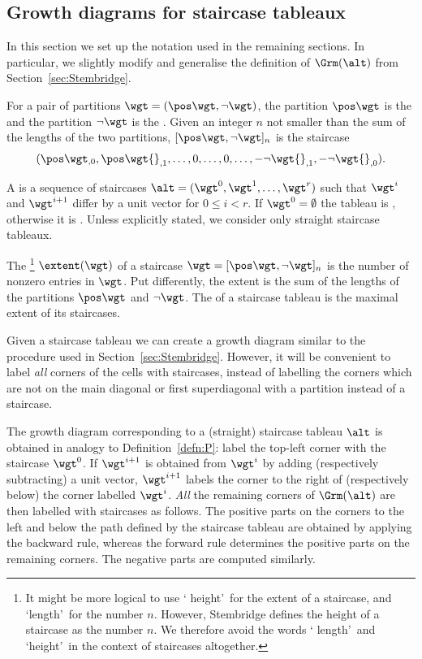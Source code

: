 \subsection{Growth diagrams for staircase tableaux}

In this section we set up the notation used in the remaining
sections. In particular, we slightly modify and generalise the
definition of $\Grm(\alt)$ from Section~\ref{sec:Stembridge}.
\begin{defi}
 For a pair of partitions $\wgt=(\pos\wgt,\neg\wgt)$, the partition
 $\pos\wgt$ is the  and the partition $\neg\wgt$
 is the . Given an integer $n$ not smaller than
 the sum of the lengths of the two partitions,
 $[\pos\wgt,\neg\wgt]_n$ is the staircase
 \[
 ({\pos\wgt}{}_{,0},\pos\wgt{}_{,1},\dots,0,\dots,0,
 \dots,-\neg\wgt{}_{,1},-\neg\wgt{}_{,0}).
 \]

 A  is a sequence of staircases
 $\alt=(\wgt^0,\wgt^1,\dots,\wgt^r)$ such that $\wgt^i$ and
 $\wgt^{i+1}$ differ by a unit vector for $0\leq i<r$. If
 $\wgt^0=\emptyset$ the tableau is , otherwise it is
 . Unless explicitly stated, we consider only straight
 staircase tableaux.

 The \footnote{It might be more logical to use \lq
 height\rq\ for the extent of a staircase, and \lq length\rq\ for
 the number $n$. However, Stembridge defines the height of a
 staircase as the number $n$. We therefore avoid the words \lq
 length\rq\ and \lq height\rq\ in the context of staircases
 altogether.} $\extent(\wgt)$ of a staircase
 $\wgt=[\pos\wgt,\neg\wgt]_n$ is the number of nonzero entries in
 $\wgt$. Put differently, the extent is the sum of the lengths of
 the partitions $\pos\wgt$ and $\neg\wgt$. The  of a
 staircase tableau is the maximal extent of its staircases.
\end{defi}

Given a staircase tableau we can create a growth diagram similar to
the procedure used in Section~\ref{sec:Stembridge}. However, it will
be convenient to label \emph{all} corners of the cells with
staircases, instead of labelling the corners which are not on the
main diagonal or first superdiagonal with a partition instead of a
staircase.
\begin{defi}
 The growth diagram \Dfn{$\Grm(\alt)$} corresponding to a (straight)
 staircase tableau $\alt$ is obtained in analogy to
 Definition~\ref{defn:P}: label the top-left corner with the
 staircase $\wgt^0$. If $\wgt^{i+1}$ is obtained from $\wgt^i$ by
 adding (respectively subtracting) a unit vector, $\wgt^{i+1}$
 labels the corner to the right of (respectively below) the corner
 labelled $\wgt^i$. \emph{All} the remaining corners of $\Grm(\alt)$
 are then labelled with staircases as follows. The positive parts
 on the corners to the left and below the path defined by the
 staircase tableau are obtained by applying the backward rule,
 whereas the forward rule determines the positive parts on the
 remaining corners. The negative parts are computed similarly.
\end{defi}
 
